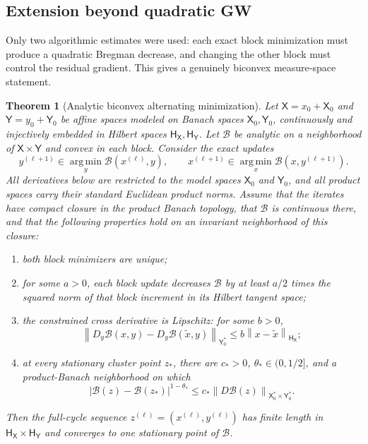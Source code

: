 \documentclass[11pt]{article}
\newtheorem{theorem}{Theorem}[section]
\theoremstyle{definition}
\theoremstyle{remark}
\newcommand{\Bcal}{\mathcal B}
\newcommand{\argmin}{\operatorname*{arg\,min}}
\newcommand{\norm}[1]{\left\lVert #1\right\rVert}
\begin{document}
\subsection{Extension beyond quadratic GW}

Only two algorithmic estimates were used: each exact block minimization must
produce a quadratic Bregman decrease, and changing the other block must
control the residual gradient.  This gives a genuinely biconvex
measure-space statement.

\begin{theorem}[Analytic biconvex alternating minimization]
\label{thm:analytic-biconvex-alternating}
Let \(\mathsf X=x_0+\mathsf X_0\) and
\(\mathsf Y=y_0+\mathsf Y_0\) be affine spaces modeled on Banach spaces
\(\mathsf X_0,\mathsf Y_0\), continuously and injectively embedded in
Hilbert spaces \(\mathsf H_{\mathsf X},\mathsf H_{\mathsf Y}\).  Let
\(\Bcal\) be analytic on a neighborhood of
\(\mathsf X\times\mathsf Y\) and convex in each block.  Consider the exact
updates
\begin{equation}\label{eq:general-two-block-updates}
 y^{(\ell+1)}
 \in\argmin_y\Bcal(x^{(\ell)},y),
 \qquad
 x^{(\ell+1)}
 \in\argmin_x\Bcal(x,y^{(\ell+1)}).
\end{equation}
All derivatives below are restricted to the model spaces
\(\mathsf X_0\) and \(\mathsf Y_0\), and all product spaces carry their
standard Euclidean product norms.
Assume that the iterates have compact closure in the product Banach topology,
that \(\Bcal\) is continuous there, and that the following properties hold
on an invariant neighborhood of this closure:
\begin{enumerate}[label=\textnormal{(\roman*)},leftmargin=2.2em]
\item both block minimizers are unique;
\item for some \(a>0\), each block update decreases \(\Bcal\) by at least
  \(a/2\) times the squared norm of that block increment in its Hilbert
  tangent space;
\item the constrained cross derivative is Lipschitz: for some \(b>0\),
  \[
   \norm{
    D_y\Bcal(x,y)-D_y\Bcal(\widetilde x,y)
   }_{\mathsf Y_0^*}
   \leq
   b\norm{x-\widetilde x}_{\mathsf H_{\mathsf X}};
  \]
\item at every stationary cluster point \(z_*\), there are
  \(c_*>0\), \(\theta_*\in(0,1/2]\), and a product-Banach neighborhood
  on which
  \[
   |\Bcal(z)-\Bcal(z_*)|^{1-\theta_*}
   \leq
   c_*\norm{D\Bcal(z)}_{\mathsf X_0^*\times\mathsf Y_0^*}.
  \]
\end{enumerate}
Then the full-cycle sequence
\(z^{(\ell)}=(x^{(\ell)},y^{(\ell)})\) has finite length in
\(\mathsf H_{\mathsf X}\times\mathsf H_{\mathsf Y}\) and converges to one
stationary point of \(\Bcal\).
\end{theorem}
\end{document}
